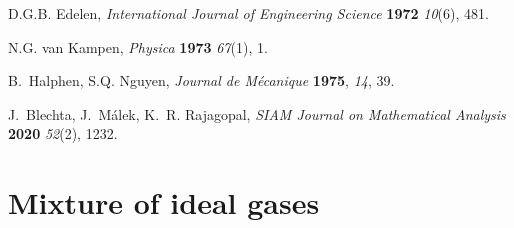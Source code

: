 \documentclass[a4paper]{article}
\begin{document}
\begin{thebibliography}{10}
D.G.B. Edelen, \textit{International Journal of Engineering Science}
  \textbf{1972} \textit{10}(6), 481.

N.G. {van Kampen}, \textit{Physica} \textbf{1973} \textit{67}(1), 1.

B.~Halphen, S.Q. Nguyen, \textit{{Journal de M{\'e}canique}} \textbf{1975},
  \textit{14}, 39.

J.~Blechta, J.~Málek, K.~R. Rajagopal, \textit{SIAM Journal on Mathematical
  Analysis} \textbf{2020} \textit{52}(2), 1232.

\end{thebibliography}

\appendix
\section{Mixture of ideal gases} \label{sec-ideal-gas}
\end{document}
